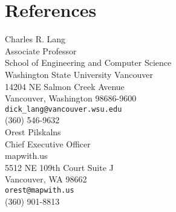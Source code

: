 \documentclass[10pt]{article}
\begin{document}
%



\section*{References}

Charles R. Lang\\ 
Associate Professor \\
School of Engineering and Computer Science \\
Washington State University Vancouver \\
14204 NE Salmon Creek Avenue \\
Vancouver, Washington 98686-9600 \\
\verb$dick_lang@vancouver.wsu.edu$ \\
(360) 546-9632\\


Orest Pilskalns\\
Chief Executive Officer\\
mapwith.us\\
5512 NE 109th Court Suite J\\
Vancouver, WA 98662 \\
{\tt orest@mapwith.us} \\
(360) 901-8813\\
\end{document}
